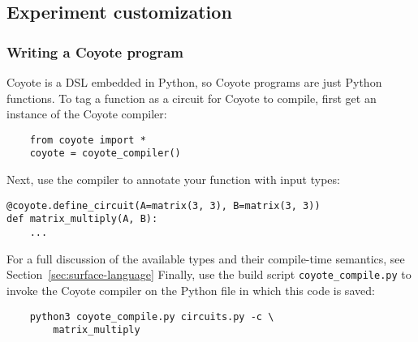 \subsection{Experiment customization}
\subsubsection{Writing a Coyote program}
Coyote is a DSL embedded in Python, so Coyote programs are just Python functions. To tag a function as a circuit for Coyote to compile, first get an instance of the Coyote compiler:
\begin{verbatim}
    from coyote import *
    coyote = coyote_compiler()
\end{verbatim}
Next, use the compiler to annotate your function with input types:
\begin{verbatim}
@coyote.define_circuit(A=matrix(3, 3), B=matrix(3, 3))
def matrix_multiply(A, B):
    ...
\end{verbatim}
For a full discussion of the available types and their compile-time semantics, see Section~\ref{sec:surface-language}
Finally, use the build script {\tt coyote\_compile.py} to invoke the Coyote compiler on the Python file in which this code is saved:
\begin{verbatim}
    python3 coyote_compile.py circuits.py -c \
        matrix_multiply
\end{verbatim}
